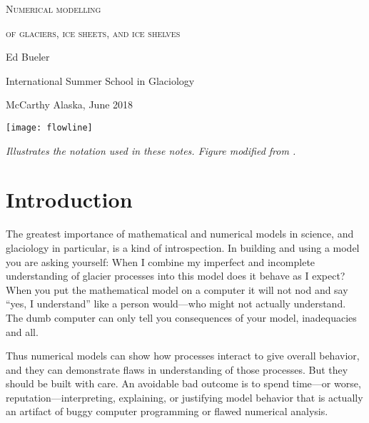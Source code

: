 \documentclass[letterpaper,final,12pt,reqno]{amsart}
\begin{document}
\graphicspath{{../figures/}}

\begin{titlepage}

  \begin{center}
  \phantom{foo}
    \vspace{1.0cm}

     {\Large \textsc{Numerical modelling}}
    \vspace{0.7cm}

     {\Large \textsc{of glaciers, ice sheets, and ice shelves}}

    \vspace{1.5cm}

    {\large Ed Bueler}
    \vspace{1cm}

    International Summer School in Glaciology

    McCarthy Alaska, June 2018

    \vfill
    
    \texttt{[image: flowline]}
  
    \scriptsize \emph{Illustrates the notation used in these notes.  Figure modified from \cite{SchoofMarine1}.} \normalsize
    
    \vspace{1.5in}
  \end{center}
\end{titlepage}

\clearpage\newpage

\setcounter{page}{2}
\section{Introduction}  \label{sec:intro}

The greatest importance of mathematical and numerical models in science, and glaciology in particular, is a kind of introspection.  In building and using a model you are asking yourself: When I combine my imperfect and incomplete understanding of glacier processes into this model does it behave as I expect?  When you put the mathematical model on a computer it will not nod and say ``yes, I understand'' like a person would---who might not actually understand.  The dumb computer can only tell you consequences of your model, inadequacies and all.

Thus numerical models can show how processes interact to give overall behavior, and they can demonstrate flaws in understanding of those processes.  But they should be built with care.  An avoidable bad outcome is to spend time---or worse, reputation---interpreting, explaining, or justifying model behavior that is actually an artifact of buggy computer programming or flawed numerical analysis.
\end{document}
